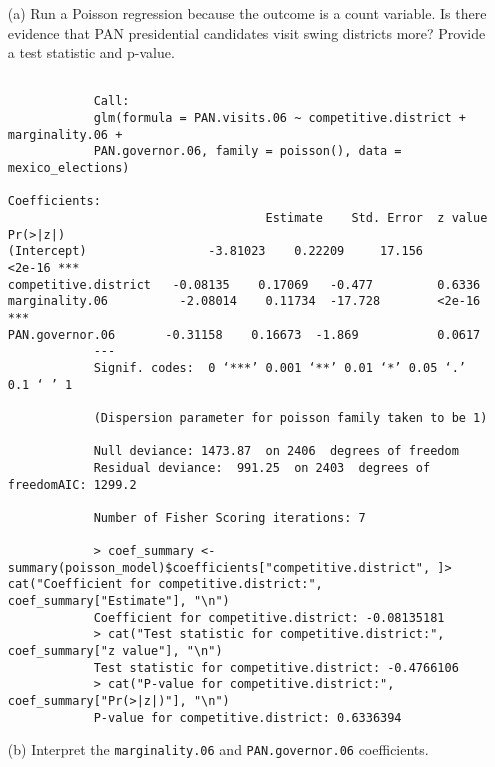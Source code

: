 \documentclass[12pt,letterpaper]{article}
\begin{document}
\begin{enumerate}
	\item [(a)]
	Run a Poisson regression because the outcome is a count variable. Is there evidence that PAN presidential candidates visit swing districts more? Provide a test statistic and p-value.
	
		 
		
			\begin{verbatim}
			
			Call:
			glm(formula = PAN.visits.06 ~ competitive.district + marginality.06 +  
			PAN.governor.06, family = poisson(), data = mexico_elections)
			
Coefficients:
									Estimate 	Std. Error 	z value 	Pr(>|z|)    
(Intercept)         		-3.81023    0.22209  	17.156  	<2e-16 ***    
competitive.district   -0.08135    0.17069   -0.477 		0.6336
marginality.06  		-2.08014    0.11734  -17.728  		<2e-16 ***
PAN.governor.06       -0.31158    0.16673  -1.869  			0.0617
			---
			Signif. codes:  0 ‘***’ 0.001 ‘**’ 0.01 ‘*’ 0.05 ‘.’ 0.1 ‘ ’ 1
			
			(Dispersion parameter for poisson family taken to be 1)    
			
			Null deviance: 1473.87  on 2406  degrees of freedom
			Residual deviance:  991.25  on 2403  degrees of freedomAIC: 1299.2
			
			Number of Fisher Scoring iterations: 7
			
			> coef_summary <- summary(poisson_model)$coefficients["competitive.district", ]> cat("Coefficient for competitive.district:", coef_summary["Estimate"], "\n")
			Coefficient for competitive.district: -0.08135181 
			> cat("Test statistic for competitive.district:", coef_summary["z value"], "\n")
			Test statistic for competitive.district: -0.4766106 
			> cat("P-value for competitive.district:", coef_summary["Pr(>|z|)"], "\n")
			P-value for competitive.district: 0.6336394 \end{verbatim}

	\item [(b)]
	Interpret the \texttt{marginality.06} and \texttt{PAN.governor.06} coefficients.
	
			 
			
	\begin{verbatim}
	

\end{verbatim}
\end{enumerate}
\end{document}
